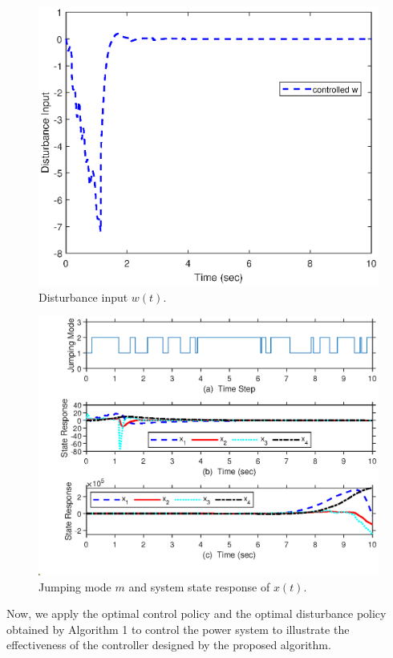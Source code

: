 \documentclass[journal]{IEEEtran}
\begin{document}
\begin{figure} %
	\centering
	\includegraphics[scale=0.6]{2w.eps}
	\caption{Disturbance input $w(t)$.}
	\label{fig:10}
	\end{figure}
	
\begin{figure} %
	\centering
	\includegraphics[scale=0.6]{2xstate.eps}
	\caption{Jumping mode $m$ and system state response of $x(t)$.}
	\label{fig:11}
\end{figure}

Now, we apply the optimal control policy and the optimal  disturbance policy obtained by Algorithm 1 to control the power system to illustrate the effectiveness of the controller designed by the proposed algorithm.
\end{document}
